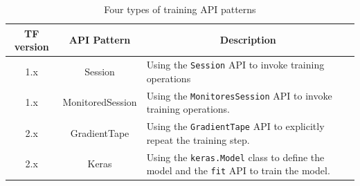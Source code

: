 \begin{table}[ht!]
  \centering
  \caption{Four types of training API patterns}
  \begin{tabularx}{\textwidth}{|c|c|X|}
    \hline
    TF version & API Pattern & \multicolumn{1}{c|}{Description} \\
    \hline
    1.x & Session & 
	  Using the {\tt Session} API to invoke training operations\\
    \hline
    1.x & MonitoredSession & 
      Using the {\tt MonitoresSession} API to invoke training operations.\\
    \hline
    2.x & GradientTape & 
      Using the {\tt GradientTape} API to explicitly repeat the training
      step.\\
    \hline
    2.x & Keras & 
      Using the {\tt keras.Model} class to define the model and the {\tt fit} API
      to train the model.\\
    \hline
  \end{tabularx}
  \label{tab:patterns}
\end{table}







